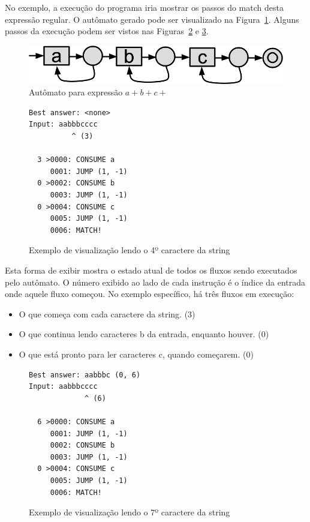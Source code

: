 \documentclass[a4paper,12pt,oneside,onecolumn]{uerj}
\begin{document}
No exemplo, a execução do programa iria mostrar os passos do match desta expressão regular. O autômato gerado pode ser visualizado na Figura~\ref{fig:view_automaton}. Alguns passos da execução podem ser vistos nas Figuras~\ref{fig:exemplo_view_passo_3} e \ref{fig:exemplo_view_passo_6}.

\begin{figure}[!htbp]
  \centering
  \includegraphics[scale=0.35]{figures/view_automaton.png}
  \caption{Autômato para expressão $a+b+c+$}
  \label{fig:view_automaton}
\end{figure}

\begin{figure}[!htbp]
  \centering
\begin{verbatim}
Best answer: <none>
Input: aabbbcccc
          ^ (3)

  3 >0000: CONSUME a
     0001: JUMP (1, -1)
  0 >0002: CONSUME b
     0003: JUMP (1, -1)
  0 >0004: CONSUME c
     0005: JUMP (1, -1)
     0006: MATCH!
\end{verbatim}
  \caption{Exemplo de visualização lendo o 4º caractere da string}
  \label{fig:exemplo_view_passo_3}
\end{figure}

Esta forma de exibir mostra o estado atual de todos os fluxos sendo executados pelo autômato. O número exibido ao lado de cada instrução é o índice da entrada onde aquele fluxo começou. No exemplo específico, há três fluxos em execução: 

\begin{itemize}
\item{O que começa com cada caractere da string. (3)}
\item{O que continua lendo caracteres b da entrada, enquanto houver. (0)}
\item{O que está pronto para ler caracteres c, quando começarem. (0)}
\end{itemize}


\begin{figure}[!htbp]
  \centering
\begin{verbatim}
Best answer: aabbbc (0, 6)
Input: aabbbcccc
             ^ (6)

  6 >0000: CONSUME a
     0001: JUMP (1, -1)
     0002: CONSUME b
     0003: JUMP (1, -1)
  0 >0004: CONSUME c
     0005: JUMP (1, -1)
     0006: MATCH!
\end{verbatim}
  \caption{Exemplo de visualização lendo o 7º caractere da string}
  \label{fig:exemplo_view_passo_6}
\end{figure}
\end{document}
